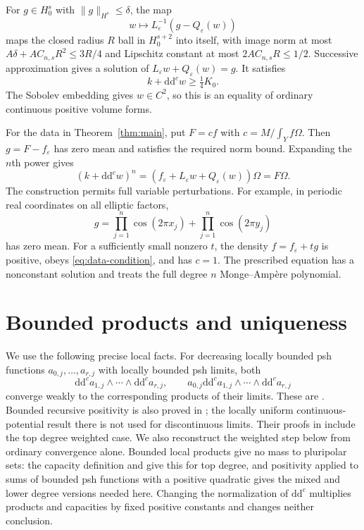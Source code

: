 \documentclass[11pt]{article}
\newcommand{\ddc}{\mathrm{d}\mathrm{d}^c}
\newcommand{\eps}{\varepsilon}
\newcommand{\Om}{\Omega}
\begin{document}
For $g\in H^s_0$ with $\|g\|_{H^s}\le\delta$, the map
\[
 w\longmapsto L_\eps^{-1}(g-Q_\eps(w))
\]
maps the closed radius $R$ ball in $H^{s+2}_0$ into itself, with
image norm at most $A\delta+AC_{n,s}R^2\le3R/4$ and Lipschitz constant
at most $2AC_{n,s}R\le1/2$. Successive approximation gives a solution of
$L_\eps w+Q_\eps(w)=g$. It satisfies
\[
 k+\ddc w\ge\tfrac14K_0.
\]
The Sobolev embedding gives $w\in C^2$, so this is an equality of
ordinary continuous positive volume forms.

For the data in Theorem~\ref{thm:main}, put $F=cf$ with
$c=M/\int_Yf\Om$. Then $g=F-f_\eps$ has zero mean and satisfies the
required norm bound. Expanding the $n$th power gives
\begin{equation}\label{eq:upstairs-equation}
 (k+\ddc w)^n=(f_\eps+L_\eps w+Q_\eps(w))\Om=F\Om.
\end{equation}
The construction permits full variable perturbations. For example, in
periodic real coordinates on all elliptic factors,
\[
 g=\prod_{j=1}^n\cos(2\pi x_j)
     +\prod_{j=1}^n\cos(2\pi y_j)
\]
has zero mean. For a sufficiently small nonzero $t$, the density
$f=f_\eps+tg$ is positive, obeys \eqref{eq:data-condition}, and has
$c=1$. The prescribed equation has a nonconstant solution and treats
the full degree $n$ Monge--Amp\`ere polynomial.

\section{Bounded products and uniqueness}\label{sec:rough}

We use the following precise local facts. For decreasing locally bounded
psh functions $a_{0,j},\ldots,a_{r,j}$ with locally bounded psh limits,
both
\[
 \ddc a_{1,j}\wedge\cdots\wedge\ddc a_{r,j},\qquad
 a_{0,j}\ddc a_{1,j}\wedge\cdots\wedge\ddc a_{r,j}
\]
converge weakly to the corresponding products of their limits.
These are \cite[Theorems 2.1 and 2.4]{BT82}. Bounded recursive positivity
is also proved in \cite[Proposition 2.9]{BT76}; the locally uniform
continuous-potential result there is not used for discontinuous limits.
Their proofs in \cite{BT82} include the
top degree weighted case. We also reconstruct the weighted step below
from ordinary convergence alone. Bounded local products give no mass to
pluripolar sets: the capacity definition and
\cite[Theorem 6.9]{BT82} give this for top degree, and positivity applied
to sums of bounded psh functions with a positive quadratic gives the
mixed and lower degree versions needed here. Changing the normalization
of $\ddc$ multiplies products and capacities by fixed positive constants
and changes neither conclusion.
\end{document}
